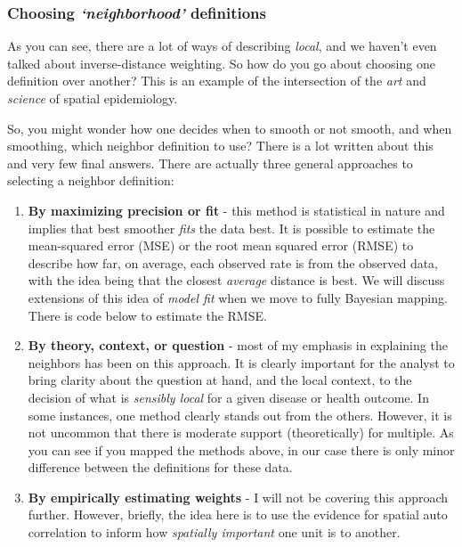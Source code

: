 \documentclass[
]{book}
\providecommand{\tightlist}{%
  \setlength{\itemsep}{0pt}\setlength{\parskip}{0pt}}
\begin{document}
\hypertarget{choosing-neighborhood-definitions}{%
\subsubsection{\texorpdfstring{Choosing \emph{`neighborhood'} definitions}{Choosing `neighborhood' definitions}}\label{choosing-neighborhood-definitions}}

As you can see, there are a lot of ways of describing \emph{local}, and we haven't even talked about inverse-distance weighting. So how do you go about choosing one definition over another? This is an example of the intersection of the \emph{art} and \emph{science} of spatial epidemiology.

So, you might wonder how one decides when to smooth or not smooth, and when smoothing, which neighbor definition to use? There is a lot written about this and very few final answers. There are actually three general approaches to selecting a neighbor definition:

\begin{enumerate}
\def\labelenumi{\arabic{enumi}.}
\tightlist
\item
  \textbf{By maximizing precision or fit} - this method is statistical in nature and implies that best smoother \emph{fits} the data best. It is possible to estimate the mean-squared error (MSE) or the root mean squared error (RMSE) to describe how far, on average, each observed rate is from the observed data, with the idea being that the closest \emph{average} distance is best. We will discuss extensions of this idea of \emph{model fit} when we move to fully Bayesian mapping. There is code below to estimate the RMSE.
\item
  \textbf{By theory, context, or question} - most of my emphasis in explaining the neighbors has been on this approach. It is clearly important for the analyst to bring clarity about the question at hand, and the local context, to the decision of what is \emph{sensibly local} for a given disease or health outcome. In some instances, one method clearly stands out from the others. However, it is not uncommon that there is moderate support (theoretically) for multiple. As you can see if you mapped the methods above, in our case there is only minor difference between the definitions for these data.
\item
  \textbf{By empirically estimating weights} - I will not be covering this approach further. However, briefly, the idea here is to use the evidence for spatial auto correlation to inform how \emph{spatially important} one unit is to another.
\end{enumerate}
\end{document}
